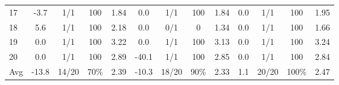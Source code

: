 \begin{table}[p]
{\begin{tabular}{l|cccc|cccc|cccc}
17 & -3.7 & 1/1 & 100 & 1.84 & 0.0 & 1/1 & 100 & 1.84 & 0.0 & 1/1 & 100 & 1.95 \\
18 & 5.6 & 1/1 & 100 & 2.18 & 0.0 & 0/1 & 0 & 1.34 & 0.0 & 1/1 & 100 & 1.66 \\
19 & 0.0 & 1/1 & 100 & 3.22 & 0.0 & 1/1 & 100 & 3.13 & 0.0 & 1/1 & 100 & 3.24 \\
20 & 0.0 & 1/1 & 100 & 2.89 & -40.1 & 1/1 & 100 & 2.85 & 0.0 & 1/1 & 100 & 2.84 \\
\midrule
Avg & -13.8 & 14/20 & 70\% & 2.39 & -10.3 & 18/20 & 90\% & 2.33 & 1.1 & 20/20 & 100\% & 2.47 \\
\bottomrule
\end{tabular}%
}
\end{table}
